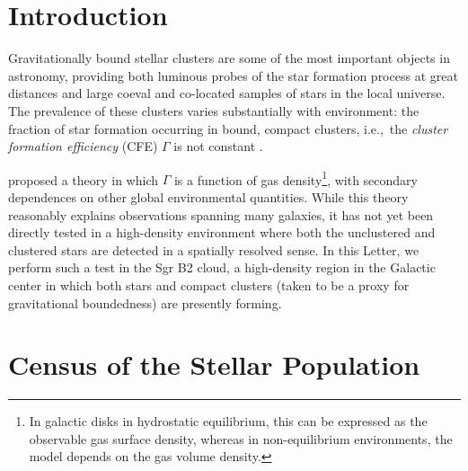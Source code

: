 \documentclass[twocolumn]{aastex62}
\begin{document}
\section{Introduction}
Gravitationally bound stellar clusters are some of the most important objects
in astronomy, providing both luminous probes of the star formation process at
great distances \citep[e.g.,][among many
others]{Brodie2006a,Adamo2013a,Kruijssen2018b,Kruijssen2018a} and large coeval
and co-located samples of stars in the local universe.  The prevalence of these
clusters varies substantially with environment: the fraction of star formation
occurring in bound, compact clusters, i.e.,~the \emph{cluster formation
efficiency} (CFE) $\Gamma$ is not constant
\citep{Adamo2015a,Johnson2016a,Messa2018a}.

\citet{Kruijssen2012a} proposed a theory in which $\Gamma$ is a function of gas
density\footnote{In galactic disks in hydrostatic equilibrium, this can be
expressed as the observable gas surface density, whereas in non-equilibrium
environments, the model depends on the gas volume density.}, with secondary
dependences on other global environmental quantities.  While this theory
reasonably explains observations spanning many galaxies, it has not yet been
directly tested in a
high-density environment where both the unclustered and clustered stars are
detected in a spatially resolved sense.  In this Letter, we perform such a test
in the Sgr B2 cloud, a high-density region in the Galactic center in which both
stars and compact clusters (taken to be a proxy for gravitational boundedness)
are presently forming.


\section{Census of the Stellar Population}
\end{document}
